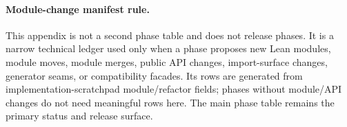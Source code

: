 \paragraph{Module-change manifest rule.} This appendix is not a second phase table and does not release phases. It is a narrow technical ledger used only when a phase proposes new Lean modules, module moves, module merges, public API changes, import-surface changes, generator seams, or compatibility facades. Its rows are generated from implementation-scratchpad module/refactor fields; phases without module/API changes do not need meaningful rows here. The main phase table remains the primary status and release surface.

